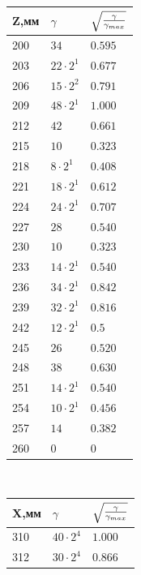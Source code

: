 \documentclass[a4paper, titlepage, 10pt]{article}
\begin{document}
\begin{minipage}{0.4\textwidth}
\begin{center}
 \begin{tabular}{|l|l|l|}
  \hline
  Z,мм & \( \gamma \) & \( \sqrt{\gamma \over  \gamma_{max}} \) \\
  \hline
  200 & \( 34 \) & \( 0.595 \) \\
  \hline
  203 & \( 22 \cdot 2^1 \) & \( 0.677 \) \\
  \hline
  206 & \( 15 \cdot 2^2 \) & \( 0.791 \) \\
  \hline
  209 & \( 48 \cdot 2^1 \) & \( 1.000 \) \\
  \hline
  212 & \( 42 \) & \( 0.661 \) \\
  \hline
  215 & \( 10 \) & \( 0.323 \) \\
  \hline
  218 & \( 8 \cdot 2^1 \) & \( 0.408 \) \\
  \hline
  221 & \( 18 \cdot 2^1 \) & \( 0.612 \) \\
  \hline
  224 & \( 24 \cdot 2^1 \) & \( 0.707 \) \\
  \hline
  227 & \( 28 \) & \( 0.540 \) \\
  \hline
  230 & \( 10 \) & \( 0.323 \) \\
  \hline
  233 & \( 14 \cdot 2^1 \) & \( 0.540 \) \\
  \hline
  236 & \( 34 \cdot 2^1 \) & \( 0.842 \) \\
  \hline
  239 & \( 32 \cdot 2^1 \) & \( 0.816 \) \\
  \hline
  242 & \( 12 \cdot 2^1 \) & \( 0.5 \) \\
  \hline
  245 & \( 26 \) & \( 0.520 \) \\
  \hline
  248 & \( 38 \) & \( 0.630 \) \\
  \hline
  251 & \( 14 \cdot 2^1 \) & \( 0.540 \) \\
  \hline
  254 & \( 10 \cdot 2^1 \) & \( 0.456 \) \\
  \hline
  257 & \( 14 \) & \( 0.382 \) \\
  \hline
  260 & \( 0 \) & \( 0 \) \\
  \hline
 \end{tabular}
\\[1cm]
 \begin{tabular}{|l|l|l|}
  \hline
  X,мм & \( \gamma \) & \( \sqrt{\gamma \over  \gamma_{max}} \) \\
  \hline
  310 & \( 40 \cdot 2^4 \) & \( 1.000 \) \\
  \hline
  312 & \( 30 \cdot 2^4 \) & \( 0.866 \) \\

\end{tabular}
\end{center}
\end{minipage}
\end{document}
